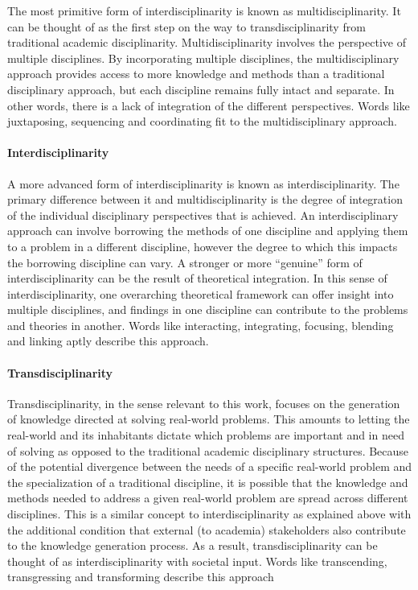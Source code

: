 \documentclass[a4paper]{article}
\begin{document}
The most primitive form of interdisciplinarity is known as
multidisciplinarity. It can be thought of as the first step on the way to
transdisciplinarity from traditional academic disciplinarity.
Multidisciplinarity involves the perspective of multiple disciplines. By
incorporating multiple disciplines, the multidisciplinary approach provides
access to more knowledge and methods than a traditional disciplinary approach,
but each discipline remains fully intact and separate. In other words, there
is a lack of integration of the different perspectives. Words like
juxtaposing, sequencing and coordinating fit to the multidisciplinary
approach.

\paragraph{Interdisciplinarity}

A more advanced form of interdisciplinarity is known as interdisciplinarity.
The primary difference between it and multidisciplinarity is the degree of
integration of the individual disciplinary perspectives that is achieved. An
interdisciplinary approach can involve borrowing the methods of one discipline
and applying them to a problem in a different discipline, however the degree
to which this impacts the borrowing discipline can vary. A stronger or more
``genuine'' form of interdisciplinarity can be the result of theoretical
integration. In this sense of interdisciplinarity, one overarching theoretical
framework can offer insight into multiple disciplines, and findings in one
discipline can contribute to the problems and theories in another. Words like
interacting, integrating, focusing, blending and linking aptly describe this
approach.

\paragraph{Transdisciplinarity}

Transdisciplinarity, in the sense relevant to this work, focuses on the
generation of knowledge directed at solving real-world problems. This amounts
to letting the real-world and its inhabitants dictate which problems are
important and in need of solving as opposed to the traditional academic
disciplinary structures. Because of the potential divergence between the needs
of a specific real-world problem and the specialization of a traditional
discipline, it is possible that the knowledge and methods needed to address a
given real-world problem are spread across different disciplines. This is a
similar concept to interdisciplinarity as explained above with the additional
condition that external (to academia) stakeholders also contribute to the
knowledge generation process. As a result, transdisciplinarity can be thought
of as interdisciplinarity with societal input. Words like transcending,
transgressing and transforming describe this approach
\end{document}
